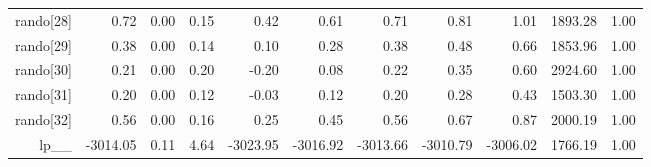 \begin{table}[ht]
\begin{tabular}{rrrrrrrrrrr}
  rando[28] & 0.72 & 0.00 & 0.15 & 0.42 & 0.61 & 0.71 & 0.81 & 1.01 & 1893.28 & 1.00 \\ 
  rando[29] & 0.38 & 0.00 & 0.14 & 0.10 & 0.28 & 0.38 & 0.48 & 0.66 & 1853.96 & 1.00 \\ 
  rando[30] & 0.21 & 0.00 & 0.20 & -0.20 & 0.08 & 0.22 & 0.35 & 0.60 & 2924.60 & 1.00 \\ 
  rando[31] & 0.20 & 0.00 & 0.12 & -0.03 & 0.12 & 0.20 & 0.28 & 0.43 & 1503.30 & 1.00 \\ 
  rando[32] & 0.56 & 0.00 & 0.16 & 0.25 & 0.45 & 0.56 & 0.67 & 0.87 & 2000.19 & 1.00 \\ 
  lp\_\_ & -3014.05 & 0.11 & 4.64 & -3023.95 & -3016.92 & -3013.66 & -3010.79 & -3006.02 & 1766.19 & 1.00 \\ 
   \hline
\end{tabular}
\label{scalefit_tab}
\end{table}
